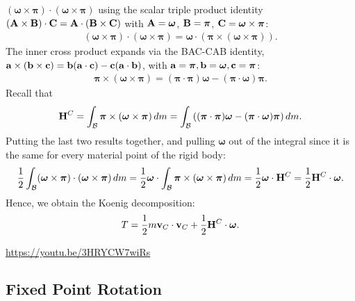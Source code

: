 \documentclass[
  letterpaper,
  DIV=11,
  numbers=noendperiod]{scrreprt}
\newcommand{\lp}{\left(}
\newcommand{\rp}{\right)}
\newcommand{\bomega}{\boldsymbol{\omega}}
\newcommand{\bpi}{\boldsymbol{\pi}}
\begin{document}
\((\bomega\times\bpi)\cdot(\bomega\times\bpi)\) using the scalar triple
product identity
\(({\bf A}\times{\bf B})\cdot{\bf C}={\bf A}\cdot({\bf B}\times{\bf C})\)
with \({\bf A}=\bomega\), \({\bf B}=\bpi\),
\({\bf C}=\bomega\times\bpi\): \begin{align}
    (\bomega\times\bpi)\cdot(\bomega\times\bpi) = \bomega\cdot\lp\bpi\times(\bomega\times\bpi)\rp.
\end{align} The inner cross product expands via the BAC-CAB identity,
\({\bf a}\times({\bf b}\times{\bf c}) = {\bf b}({\bf a}\cdot{\bf c})-{\bf c}({\bf a}\cdot{\bf b})\),
with \({\bf a}=\bpi,{\bf b}=\bomega,{\bf c}=\bpi\): \begin{align}
    \bpi\times(\bomega\times\bpi) = (\bpi\cdot\bpi)\bomega-(\bpi\cdot\bomega)\bpi.
\end{align} Recall that \begin{align}
    {\bf H}^C = \int_{\mathcal{B}}\bpi\times(\bomega\times\bpi)\,dm = \int_{\mathcal{B}}\lp(\bpi\cdot\bpi)\bomega-(\bpi\cdot\bomega)\bpi\rp dm.
\end{align} Putting the last two results together, and pulling
\(\bomega\) out of the integral since it is the same for every material
point of the rigid body: \begin{align}
    \frac{1}{2}\int_{\mathcal{B}}(\bomega\times\bpi)\cdot(\bomega\times\bpi)\,dm = \frac{1}{2}\bomega\cdot\int_{\mathcal{B}}\bpi\times(\bomega\times\bpi)\,dm = \frac{1}{2}\bomega\cdot{\bf H}^C = \frac{1}{2}{\bf H}^C\cdot\bomega.
\end{align} Hence, we obtain the Koenig decomposition: \begin{align}
    T = \frac{1}{2}m{\bf v}_C\cdot{\bf v}_C+\frac{1}{2}{\bf H}^C\cdot\bomega.
\end{align}

\url{https://youtu.be/3HRYCW7wiRs}

\subsection{Fixed Point Rotation}\label{fixed-point-rotation}
\end{document}
